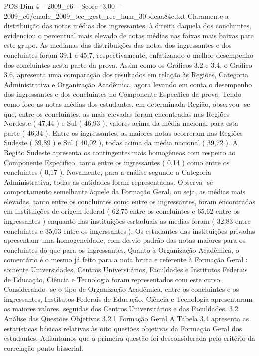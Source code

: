 \begin{textsample}{POS Dim 4 – 2009\_c6 – Score -3.00 – 2009\_c6/enade\_2009\_tec\_gest\_rec\_hum\_30bdeaa84c.txt}
Claramente a distribuição das notas médias dos ingressantes, à direita daquela dos concluintes, evidenciou o percentual mais elevado de notas médias nas faixas mais baixas para este grupo.
As medianas das distribuições das notas dos ingressantes e dos concluintes foram 39,1 e 45,7, respectivamente, enfatizando o melhor desempenho dos concluintes nesta parte da prova.
Assim como os Gráficos 3.2 e 3.4, o Gráfico 3.6, apresenta uma comparação dos resultados em relação às Regiões, Categoria Administrativa e Organização Acadêmica, agora levando em conta o desempenho dos ingressantes e dos concluintes no Componente Específico da prova.
Tendo como foco as notas médias dos estudantes, em determinada Região, observou -se que, entre os concluintes, as mais elevadas foram encontradas nas Regiões Nordeste ( 47,44 ) e Sul ( 46,93 ), valores acima da média nacional para esta parte ( 46,34 ).
Entre os ingressantes, as maiores notas ocorreram nas Regiões Sudeste ( 39,89 ) e Sul ( 40,02 ), todas acima da média nacional ( 39,72 ).
A Região Sudeste apresenta os contingentes mais homogêneos com respeito ao Componente Específico, tanto entre os ingressantes ( 0,14 ) como entre os concluintes ( 0,17 ).
Novamente, para a análise segundo a Categoria Administrativa, todas as entidades foram representadas.
Observa -se comportamento semelhante àquele da Formação Geral, ou seja, as médias mais elevadas, tanto entre os concluintes como entre os ingressantes, foram encontradas em instituições de origem federal ( 62,75 entre os concluintes e 65,62 entre os ingressantes ) enquanto nas instituições esrtaduais as medias foram ( 32,83 entre concluintes e 35,63 entre os ingerssantes ).
Os estudantes das instituições privadas apresentam uma homogeneidade, com desvio padrão das notas maiores para os concluintes do que para os ingressantes.
Quanto à Organização Acadêmica, o comentário é o mesmo já feito para a nota bruta e referente à Formação Geral : somente Universidades, Centros Universitários, Faculdades e Institutos Federais de Educação, Ciência e Tecnologia foram representados com este curso.
Considerando -se o tipo de Organização Acadêmica, entre os concluintes e os ingressantes, Institutos Federais de Educação, Ciência e Tecnologia apresentaram os maiores valores, seguidas dos Centros Universitários e das Faculdades. 3.2 Análise das Questões Objetivas 3.2.1 Formação Geral A Tabela 3.4 apresenta as estatísticas básicas relativas às oito questões objetivas da Formação Geral dos estudantes.
Adiantamos que a primeira questão foi desconsiderada pelo critério da correlação ponto-bisserial.

\end{textsample}
